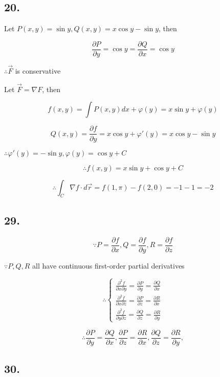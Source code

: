 \documentclass{article}
\begin{document}
  \subsection*{20. }

  Let $P(x, y) = \sin y, Q(x, y) = x \cos y - \sin y$, then

  $$\frac{\partial P}{\partial y} = \cos y = \frac{\partial Q}{\partial x} = \cos y$$

  $\therefore \overrightarrow{F}$ is conservative

  Let $\overrightarrow{F} = \nabla F$, then

  $$f(x, y) = \int P(x, y) dx + \varphi(y) = x\sin y + \varphi(y)$$

  $$Q(x, y) = \frac{\partial f}{\partial y} = x\cos y + \varphi'(y) = x\cos y - \sin y$$

  $\therefore \varphi'(y) = -\sin y, \varphi(y) = \cos y + C$

  $$\therefore f(x, y) = x\sin y + \cos y + C$$

  $$\therefore \int_C \nabla f \cdot d\overrightarrow{r} = f(1, \pi) - f(2, 0) = -1 - 1 = -2$$
  
  \subsection*{29. }

  $$\because P = \frac{\partial f}{\partial x} , Q = \frac{\partial f}{\partial y}, R = \frac{\partial f}{\partial z}$$

  $\because P, Q, R$ all have continuous first-order partial derivatives

  $$\therefore \left \{ \begin{array}{ll}
    \frac{\partial^2 f}{\partial x \partial y} = \frac{\partial P}{\partial y} = \frac{\partial Q}{\partial x} \\
    \frac{\partial^2 f}{\partial x \partial z} = \frac{\partial P}{\partial z} = \frac{\partial R}{\partial x} \\
    \frac{\partial^2 f}{\partial y \partial z} = \frac{\partial Q}{\partial z} = \frac{\partial R}{\partial y}
  \end{array}\right.$$

  $$
  \therefore 
  \frac{\partial P}{\partial y} = \frac{\partial Q}{\partial x}, 
  \frac{\partial P}{\partial z} = \frac{\partial R}{\partial x}, 
  \frac{\partial Q}{\partial z} = \frac{\partial R}{\partial y},
  $$
  \subsection*{30. }
\end{document}
